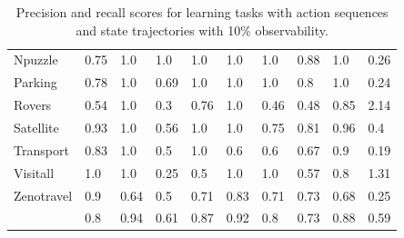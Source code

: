 \begin{table}[hbt!]
\begin{center}
\begin{footnotesize}
\begin{tabular}{l|l|l|l|l|l|l||l|l||l|}
				Npuzzle & 0.75 & 1.0 & 1.0 & 1.0 & 1.0 & 1.0 & 0.88 & 1.0& 0.26 \\ %
				Parking & 0.78 & 1.0 & 0.69 & 1.0 & 1.0 & 1.0 & 0.8 & 1.0& 0.24 \\ %
				Rovers & 0.54 & 1.0 & 0.3 & 0.76 & 1.0 & 0.46 & 0.48 & 0.85 & 2.14 \\ %
				Satellite & 0.93 & 1.0 & 0.56 & 1.0 & 1.0 & 0.75 & 0.81 & 0.96& 0.4 \\ %
				Transport & 0.83 & 1.0 & 0.5 & 1.0 & 0.6 & 0.6 & 0.67 & 0.9& 0.19 \\ %
				Visitall & 1.0 & 1.0 & 0.25 & 0.5 & 1.0 & 1.0 & 0.57 & 0.8& 1.31 \\ %
				Zenotravel & 0.9 & 0.64 & 0.5 & 0.71 & 0.83 & 0.71 & 0.73 & 0.68& 0.25 \\ %
				\hline
				\bf & 0.8 & 0.94 & 0.61 & 0.87 & 0.92 & 0.8 & 0.73 & 0.88 & 0.59 \\
			\end{tabular}
                  \end{footnotesize}			
		\end{center}
	\caption{\small Precision and recall scores for learning tasks with \FO action sequences and \PO state trajectories with 10\% observability.}
	\label{tab:results_minimum_100_10}
\end{table}


